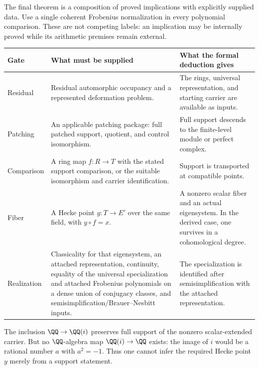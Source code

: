 
The final theorem is a composition of proved implications with explicitly supplied data. Use a single coherent Frobenius normalization in every polynomial comparison. These are not competing labels: an implication may be internally proved while its arithmetic premises remain external.

{\small
\begin{tabularx}{\linewidth}{@{}p{.13\linewidth}YY@{}}\toprule
\textbf{Gate} & \textbf{What must be supplied} & \textbf{What the formal deduction gives}\\\midrule
Residual & Residual automorphic occupancy and a represented deformation problem. & The rings, universal representation, and starting carrier are available as inputs.\\
Patching & An applicable patching package: full patched support, quotient, and control isomorphism. & Full support descends to the finite-level module or perfect complex.\\
Comparison & A ring map $f:R\to T$ with the stated support comparison, or the suitable isomorphism and carrier identification. & Support is transported at compatible points.\\
Fiber & A Hecke point $y:T\to E'$ over the same field, with $y\circ f=x$. & A nonzero scalar fiber and an actual eigensystem. In the derived case, one survives in a cohomological degree.\\
Realization & Classicality for that eigensystem, an attached representation, continuity, equality of the universal specialization and attached Frobenius polynomials on a dense union of conjugacy classes, and semisimplification/Brauer--Nesbitt inputs. & The specialization is identified after semisimplification with the attached representation.\\\bottomrule
\end{tabularx}}

The inclusion $\QQ\to\QQ(i)$ preserves full support of the nonzero scalar-extended carrier. But no $\QQ$-algebra map $\QQ(i)\to\QQ$ exists: the image of $i$ would be a rational number $a$ with $a^2=-1$. Thus one cannot infer the required Hecke point $y$ merely from a support statement.

